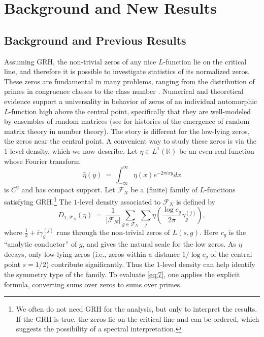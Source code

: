 \documentclass[12pt,reqno]{amsart}
\numberwithin{equation}{section}
\theoremstyle{plain}
\begin{document}
\section{Background and New Results}

\subsection{Background and Previous Results}\label{sec:backgroundprevious}

Assuming GRH, the non-trivial zeros of any nice $L$-function lie on the critical line, and therefore it is possible to investigate statistics of its normalized zeros. These zeros are fundamental in many problems, ranging from the distribution of primes in congruence classes to the class number \cite{CI,Go,GZ,RubSa}. Numerical and theoretical evidence \cite{Hej,Mon2,Od1,Od2,RS} support a universality in behavior of zeros of an individual automorphic $L$-function high above the central point, specifically that they are well-modeled by ensembles of random matrices (see \cite{FM,Ha} for histories of the emergence of random matrix theory in number theory). The story is different for the low-lying zeros, the zeros near the central point. A convenient way to study these zeros is via the 1-level density, which we now describe. Let $\eta\in L^1(\mathbb R)$ be an even real function whose Fourier transform
\begin{equation}
  \label{eq:9}
 \hat{\eta}(y)\ =\ \int_{-\infty}^\infty \eta(x) e^{-2\pi ixy}dx
\end{equation}
is $C^2$ and has compact support. Let $\mathcal{F}_N$ be a (finite) family of
$L$-functions satisfying GRH.\footnote{\label{footnote:spectral}We often do not need GRH for the analysis, but only to interpret the results. If the GRH is true, the zeros lie on the critical line and can be ordered, which suggests the possibility of a spectral interpretation.} The $1$-level density associated to
$\mathcal{F}_N$ is defined by
\begin{equation}
\label{eq:7} D_{1;\mathcal{F}_N}(\eta)\ =\ \frac1{|\mathcal{F}_N|}
\sum_{g\in\mathcal{F}_N} \sum_{j} \eta\left(\frac{\log
c_g }{2\pi}\gamma_g^{(j)}\right),
\end{equation}
where ${\frac{1}{2}} + i\gamma_g^{(j)}$ runs through the non-trivial zeros
of $L(s,g)$. Here $c_g$ is the ``analytic conductor'' of $g$, and
gives the natural scale for the low zeros. As $\eta$ decays,
only low-lying zeros (i.e., zeros within a distance
$1/\log c_g$ of the central point $s=1/2$) contribute
significantly. Thus the $1$-level density can help identify the
symmetry type of the family. To evaluate \eqref{eq:7}, one applies the explicit formula,
converting sums over zeros to sums over primes.
\end{document}
